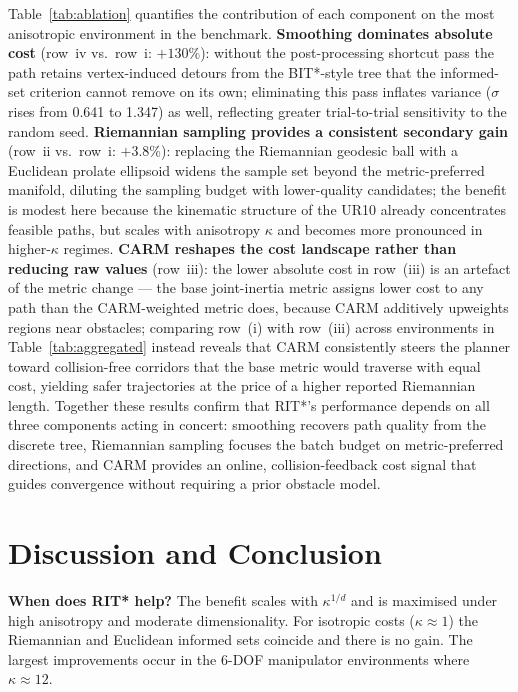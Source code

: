 \documentclass[journal]{IEEEtran}
\begin{document}
Table~\ref{tab:ablation} quantifies the contribution of each
component on the most anisotropic environment in the benchmark.
\textbf{Smoothing dominates absolute cost} (row~iv vs.~row~i:
$+130\%$): without the post-processing shortcut pass the path
retains vertex-induced detours from the BIT*-style tree that
the informed-set criterion cannot remove on its own; eliminating
this pass inflates variance ($\sigma$ rises from 0.641 to 1.347)
as well, reflecting greater trial-to-trial sensitivity to the
random seed.
\textbf{Riemannian sampling provides a consistent secondary gain}
(row~ii vs.~row~i: $+3.8\%$): replacing the Riemannian geodesic
ball with a Euclidean prolate ellipsoid widens the sample set
beyond the metric-preferred manifold, diluting the sampling
budget with lower-quality candidates; the benefit is modest here
because the kinematic structure of the UR10 already concentrates
feasible paths, but scales with anisotropy $\kappa$ and becomes
more pronounced in higher-$\kappa$ regimes.
\textbf{CARM reshapes the cost landscape rather than reducing raw
values} (row~iii): the lower absolute cost in row~(iii) is an
artefact of the metric change --- the base joint-inertia metric
assigns lower cost to any path than the CARM-weighted metric does,
because CARM additively upweights regions near obstacles;
comparing row~(i) with row~(iii) across environments in
Table~\ref{tab:aggregated} instead reveals that CARM consistently
steers the planner toward collision-free corridors that the base
metric would traverse with equal cost, yielding safer trajectories
at the price of a higher reported Riemannian length.
Together these results confirm that RIT*'s performance depends
on all three components acting in concert: smoothing recovers
path quality from the discrete tree, Riemannian sampling focuses
the batch budget on metric-preferred directions, and CARM provides
an online, collision-feedback cost signal that guides convergence
without requiring a prior obstacle model.


\section{Discussion and Conclusion}\label{sec:conclusion}

\textbf{When does RIT* help?}
The benefit scales with $\kappa^{1/d}$ and is maximised under high
anisotropy and moderate dimensionality.
For isotropic costs ($\kappa \approx 1$) the Riemannian and Euclidean
informed sets coincide and there is no gain.
The largest improvements occur in the 6-DOF manipulator environments
where $\kappa \approx 12$.
\end{document}
